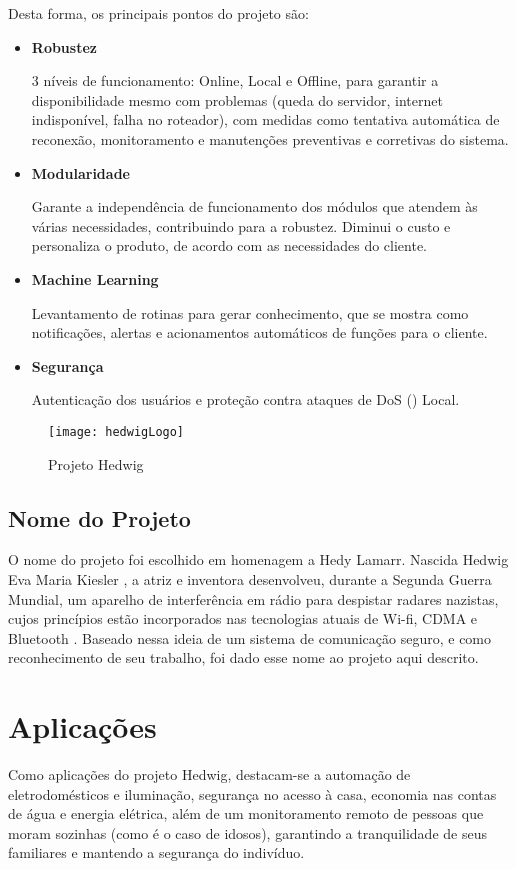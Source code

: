 Desta forma, os principais pontos do projeto são:

\begin{itemize}
\item \textbf{Robustez}

3 níveis de funcionamento: Online, Local e Offline, para garantir a disponibilidade mesmo com problemas (queda do servidor, internet indisponível, falha no roteador), com medidas como tentativa automática de reconexão, monitoramento e manutenções preventivas e corretivas do sistema.

\item \textbf{Modularidade}

Garante a independência de funcionamento dos módulos que atendem às várias necessidades, contribuindo para a robustez. Diminui o custo e personaliza o produto, de acordo com as necessidades do cliente.

\item \textbf{Machine Learning}

Levantamento de rotinas para gerar conhecimento, que se mostra como notificações, alertas e acionamentos automáticos de funções para o cliente.

\item \textbf{Segurança}

Autenticação dos usuários e proteção contra ataques de DoS (\cite{Denial of Service}) Local.
\end{itemize}


\begin{figure}[H]
	\centering
	\caption{Projeto Hedwig}
  \texttt{[image: hedwigLogo]}
\label{fig:hedwigLogo}
\end{figure}

\subsection{Nome do Projeto}
O nome do projeto foi escolhido em homenagem a Hedy Lamarr. Nascida Hedwig Eva Maria Kiesler \cite{shearer}, a atriz e inventora desenvolveu, durante a Segunda Guerra Mundial, um aparelho de interferência em rádio para despistar radares nazistas, cujos princípios estão incorporados nas tecnologias atuais de Wi-fi, CDMA e Bluetooth \cite{electronicFrontier}. Baseado nessa ideia de um sistema de comunicação seguro, e como reconhecimento de seu trabalho, foi dado esse nome ao projeto aqui descrito.

\section{Aplicações}
Como aplicações do projeto Hedwig, destacam-se a automação de eletrodomésticos e iluminação, segurança no acesso à casa, economia nas contas de água e energia elétrica, além de um monitoramento remoto de pessoas que moram sozinhas (como é o caso de idosos), garantindo a tranquilidade de seus familiares e mantendo a segurança do indivíduo.

